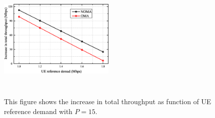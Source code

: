\documentclass[10pt,journal,final,finalsubmission,twocolumn]{IEEEtran}
\begin{document}
\begin{figure}
\centering
\includegraphics[width=0.5\textwidth,height=6cm]{3.eps}
\caption{This figure shows the increase in total throughput as function of UE reference demand with $P = 15$.}
\label{3}
\end{figure}
\end{document}
